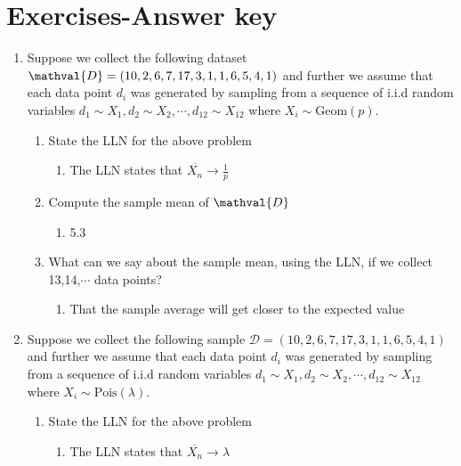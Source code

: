 \documentclass[krantz1,ChapterTOCs]{krantz}
\begin{document}
\section{Exercises-Answer key}

\begin{enumerate}
    \item Suppose we collect the following dataset $\mathval{D} = (10,2,6,7,17,3,1,1,6,5,4,1)$ and further we assume that each data point $d_{i}$ was generated by sampling from a sequence of i.i.d random variables  $d_{1} \sim X_{1}, d_{2} \sim X_{2}, \cdots, d_{12} \sim X_{12}$ where $X_{i} \sim \text{Geom}(p)$.  
    \begin{enumerate}
        \item State the LLN for the above problem
        \begin{enumerate}
            \item { \color{red}  The LLN states that $\overline{X_{n}} \to \frac{1}{p}$    } 
        \end{enumerate}
        \item Compute the sample mean of $\mathval{D}$
        \begin{enumerate}
            \item { \color{red} 5.3 } 
        \end{enumerate}
        \item What can we say about the sample mean, using the LLN, if we collect 13,14,$\cdots$ data points?
        \begin{enumerate}
            \item { \color{red} That the sample average will get closer to the expected value } 
        \end{enumerate}
        
    \end{enumerate}
    
    \item  Suppose we collect the following sample $\mathcal{D} = (10,2,6,7,17,3,1,1,6,5,4,1)$ and further we assume that each data point $d_{i}$ was generated by sampling from a sequence of i.i.d random variables  $d_{1} \sim X_{1}, d_{2} \sim X_{2}, \cdots, d_{12} \sim X_{12}$ where $X_{i} \sim \text{Pois}(\lambda)$.
    \begin{enumerate}
        \item State the LLN for the above problem
        \begin{enumerate}
            \item { \color{red}  The LLN states that $\overline{X_{n}} \to \lambda$    } 
        \end{enumerate}
        

\end{enumerate}
\end{enumerate}
\end{document}
